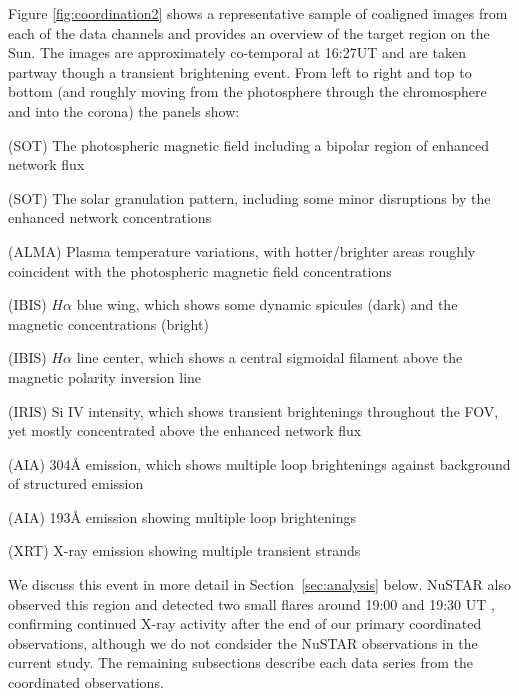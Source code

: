 \documentclass[twocolumn]{aastex62}
\newcommand{\halpha}{\ensuremath{H\alpha}}
\begin{document}
Figure \ref{fig:coordination2} shows a representative sample of coaligned images from each of the data channels and provides an overview of the target region on the Sun.
The images are approximately co-temporal at 16:27UT and are taken partway though a transient brightening event.
From left to right and top to bottom (and roughly moving from the photosphere through the chromosphere and into the corona) the panels show: 
\begin{itemize}
    {\item (SOT) The photospheric magnetic field including a bipolar region of enhanced network flux}
    {\item (SOT) The solar granulation pattern, including some minor disruptions by the enhanced network concentrations}
    {\item (ALMA) Plasma temperature variations, with hotter/brighter areas roughly coincident with the photospheric magnetic field concentrations}
    {\item (IBIS) \halpha{} blue wing, which shows some dynamic spicules (dark) and the magnetic concentrations (bright)}
    {\item (IBIS) \halpha{} line center, which shows a central sigmoidal filament above the magnetic polarity inversion line}
    {\item (IRIS) Si IV intensity, which shows transient brightenings throughout the FOV, yet mostly concentrated above the enhanced network flux}
    {\item (AIA) 304\AA{} emission, which shows multiple loop brightenings against background of structured emission}
    {\item (AIA) 193\AA{} emission showing multiple loop brightenings}
    {\item (XRT) X-ray emission showing multiple transient strands}
\end{itemize}
We discuss this event in more detail in Section~\ref{sec:analysis} below.
NuSTAR also observed this region and detected two small flares around 19:00 and 19:30 UT \citep{2018Kuhar}, confirming continued X-ray activity after the end of our primary coordinated observations, although we do not condsider the NuSTAR observations in the current study.
The remaining subsections describe each data series from the coordinated observations.
\end{document}
